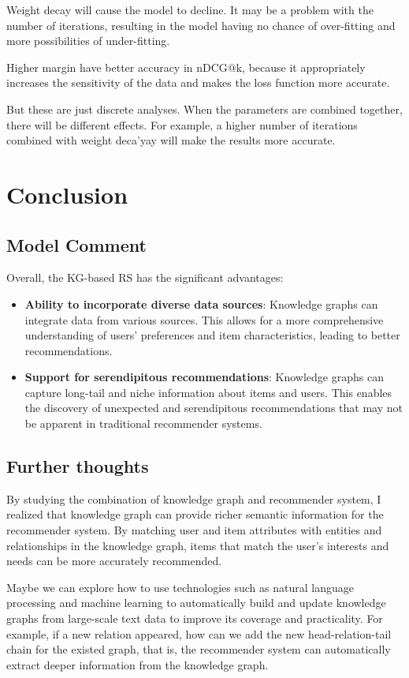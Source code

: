 \documentclass[lettersize,journal]{IEEEtran}
\begin{document}
Weight decay will cause the model to decline. It may be a problem with the number of iterations, resulting in the model having no chance of over-fitting and more possibilities of under-fitting.

Higher margin have better accuracy in nDCG@k, because it appropriately increases the sensitivity of the data and makes the loss function more accurate.

But these are just discrete analyses. When the parameters are combined together, there will be different effects. For example, a higher number of iterations combined with weight deca'yay will make the results more accurate.

\section{Conclusion}

\subsection{Model Comment}

Overall, the KG-based RS has the significant advantages:
\begin{itemize}
    \item \textbf{Ability to incorporate diverse data sources}: Knowledge graphs can integrate data from various sources. This allows for a more comprehensive understanding of users' preferences and item characteristics, leading to better recommendations.
    \item \textbf{Support for serendipitous recommendations}: Knowledge graphs can capture long-tail and niche information about items and users. This enables the discovery of unexpected and serendipitous recommendations that may not be apparent in traditional recommender systems.
\end{itemize}

\subsection{Further thoughts}

By studying the combination of knowledge graph and recommender system, I realized that knowledge graph can provide richer semantic information for the recommender system. By matching user and item attributes with entities and relationships in the knowledge graph, items that match the user's interests and needs can be more accurately recommended.

Maybe we can explore how to use technologies such as natural language processing and machine learning to automatically build and update knowledge graphs from large-scale text data to improve its coverage and practicality. For example, if a new relation appeared, how can we add the new head-relation-tail chain for the existed graph, that is, the recommender system can automatically extract deeper information from the knowledge graph.
\end{document}

